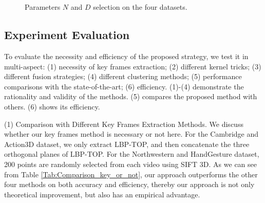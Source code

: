 \documentclass[5p]{elsarticle}
\begin{document}
\begin{figure*}[!t]
	\begin{centering}
		\centering
		\setcounter{subfigure}{0}
		 \\
		 \\
		\caption{Parameters $N$ and $D$ selection on the four datasets.}
		\label{Fig:papameter}
	\end{centering}
\end{figure*}

\subsection{Experiment Evaluation}
To evaluate the necessity and efficiency of the proposed strategy, we test it in multi-aspect: (1) necessity of key frames extraction; (2) different kernel tricks; (3) different fusion strategies; (4) different clustering methods; (5) performance comparisons with the state-of-the-art; (6) efficiency.
(1)-(4) demonstrate the rationality and validity of the methods.
(5) compares the proposed method with others.
(6) shows its efficiency.

\noindent (1) Comparison with Different Key Frames Extraction Methods.
We discuss whether our key frames method is necessary or not here.
For the Cambridge and Action3D dataset, we only extract LBP-TOP, and then concatenate the three orthogonal planes of LBP-TOP.
For the Northwestern and HandGesture dataset, 200 points are randomly selected from each video using SIFT 3D.
As we can see from Table \ref{Tab:Comparison_key_or_not}, our approach outperforms the other four methods on both accuracy and efficiency, thereby our approach is not only theoretical improvement, but also has an empirical advantage.
\end{document}
